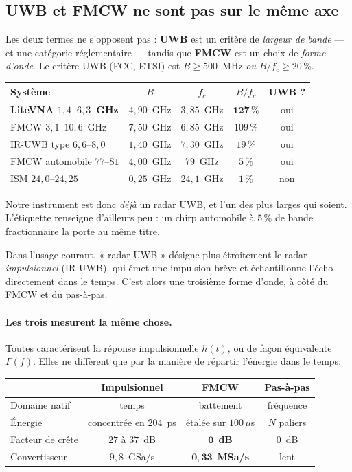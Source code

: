 \documentclass[11pt,a4paper]{article}
\begin{document}
\subsection{UWB et FMCW ne sont pas sur le même axe}
\label{sec:uwbfmcw}

Les deux termes ne s'opposent pas : \textbf{UWB} est un critère de \emph{largeur
de bande} --- et une catégorie réglementaire --- tandis que \textbf{FMCW} est un
choix de \emph{forme d'onde}. Le critère UWB (FCC, ETSI) est
$B \ge 500$~MHz \emph{ou} $B/f_c \ge 20\,\%$.

\begin{table}[h]
\centering
\begin{tabular}{lcccc}
\toprule
Système & $B$ & $f_c$ & $B/f_c$ & UWB ? \\
\midrule
\textbf{LiteVNA $1{,}4$--$6{,}3$~GHz} & $4{,}90$~GHz & $3{,}85$~GHz
  & $\mathbf{127\,\%}$ & oui \\
FMCW $3{,}1$--$10{,}6$~GHz & $7{,}50$~GHz & $6{,}85$~GHz & $109\,\%$ & oui \\
IR-UWB type $6{,}6$--$8{,}0$ & $1{,}40$~GHz & $7{,}30$~GHz & $19\,\%$ & oui \\
FMCW automobile $77$--$81$ & $4{,}00$~GHz & $79$~GHz & $5\,\%$ & oui \\
ISM $24{,}0$--$24{,}25$ & $0{,}25$~GHz & $24{,}1$~GHz & $1\,\%$ & non \\
\bottomrule
\end{tabular}
\end{table}

Notre instrument est donc \emph{déjà} un radar UWB, et l'un des plus larges qui
soient. L'étiquette renseigne d'ailleurs peu : un chirp automobile à $5\,\%$ de
bande fractionnaire la porte au même titre.

Dans l'usage courant, « radar UWB » désigne plus étroitement le radar
\emph{impulsionnel} (IR-UWB), qui émet une impulsion brève et échantillonne
l'écho directement dans le temps. C'est alors une troisième forme d'onde, à côté
du FMCW et du pas-à-pas.

\paragraph{Les trois mesurent la même chose.} Toutes caractérisent la réponse
impulsionnelle $h(t)$, ou de façon équivalente $\Gamma(f)$. Elles ne diffèrent
que par la manière de répartir l'énergie dans le temps.

\begin{table}[h]
\centering
\begin{tabular}{lccc}
\toprule
& Impulsionnel & FMCW & Pas-à-pas \\
\midrule
Domaine natif & temps & battement & fréquence \\
Énergie & concentrée en $204$~ps & étalée sur $100\,\mu$s & $N$ paliers \\
Facteur de crête & $27$ à $37$~dB & $\mathbf{0}$~\textbf{dB} & $0$~dB \\
Convertisseur & $9{,}8$~GSa/s & $\mathbf{0{,}33}$~\textbf{MSa/s} & lent \\
\bottomrule
\end{tabular}
\end{table}
\end{document}
